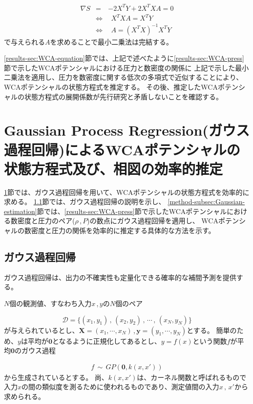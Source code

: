 \documentclass[titlepage]{jsreport}
\begin{document}
{{{\large
\begin{eqnarray}
    {\nabla}S&=&-2X^TY+2X^TXA=0\nonumber\\
    &{\Leftrightarrow}&{\ }{\ }X^TXA=X^TY\nonumber\\
    &{\Leftrightarrow}&{\ }{\ }A=(X^TX)^{-1}X^TY\label{eq:normal-equation}
\end{eqnarray}
\normalsize
で与えられる$A$を求めることで最小二乗法は完結する\cite{least-squares}。

\ref{results-sec:WCA-equation}節では、上記で述べたように\ref{results-sec:WCA-press}節で示したWCAポテンシャルにおける圧力と数密度の関係に
上記で示した最小二乗法を適用し、圧力を数密度に関する低次の多項式で近似することにより、WCAポテンシャルの状態方程式を推定する。
その後、推定したWCAポテンシャルの状態方程式の展開係数が先行研究と矛盾しないことを確認する。


\section{Gaussian Process Regression(ガウス過程回帰)によるWCAポテンシャルの状態方程式及び、相図の効率的推定}\label{method-sec:Gauss}
\ref{method-sec:Gauss}節では、ガウス過程回帰を用いて、WCAポテンシャルの状態方程式を効率的に求める。
\ref{method-subsec:Gauss}節では、ガウス過程回帰の説明を示し、
\ref{method-subsec:Gaussian-estimation}節では、\ref{results-sec:WCA-press}節で示したWCAポテンシャルにおける数密度と圧力のペア($\rho$\,,\,$P$)の数点にガウス過程回帰を適用し、
WCAポテンシャルの数密度と圧力の関係を効率的に推定する具体的な方法を示す。


\subsection{ガウス過程回帰}\label{method-subsec:Gauss}
ガウス過程回帰は、出力の不確実性も定量化できる確率的な補間予測を提供する\cite{machine-learning}。


$N$個の観測値、すなわち入力$x$\,,\,$y$の$N$個のペア

\large
\[
    \mathcal{D}=\{(x_1,y_1)\,,\,(x_2,y_2)\,,\,\cdots\,,\,(x_N,y_N)\}
\]
\normalsize
が与えられているとし、$\bm{X}=(x_1,\cdots,x_N)$\,,\,$\bm{y}=(y_1,\cdots,y_N)$とする。
簡単のため、$y$は平均が$\bm{0}$となるように正規化してあるとし、$y=f(x)$という関数$f$が平均$\bm{0}$のガウス過程

\large
\begin{eqnarray}
    f\,{\sim}\,GP(\bm{0},k(x,x'))\nonumber
\end{eqnarray}
\normalsize
から生成されているとする。
尚、$k(x,x')$は、カーネル関数と呼ばれるもので入力$x$の間の類似度を測るために使われるものであり\cite{Gauss-machine-learning}、測定値間の入力$x\,,\,x'$から求められる。

}}}
\end{document}
